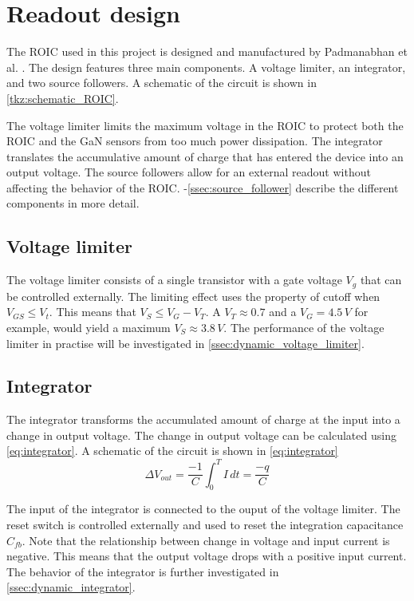 \section{Readout design}\label{sec:readout_design}
The ROIC used in this project is designed and manufactured by Padmanabhan et al. \cite{preethi}. The design features three main components. A voltage limiter, an integrator, and two source followers. A schematic of the circuit is shown in \cref{tkz:schematic_ROIC}.



The voltage limiter limits the maximum voltage in the ROIC to protect both the ROIC and the GaN sensors from too much power dissipation. The integrator translates the accumulative amount of charge that has entered the device into an output voltage. The source followers allow for an external readout without affecting the behavior of the ROIC. -\ref{ssec:source_follower} describe the different components in more detail.



\subsection{Voltage limiter}\label{ssec:voltage_limiter}
The voltage limiter consists of a single transistor with a gate voltage $V_g$ that can be controlled externally. The limiting effect uses the property of cutoff when $V_{GS}\leq V_t$. This means that $V_S\leq V_G - V_T$. A $V_T\approx0.7$ and a $V_G=4.5\,V$ for example, would yield a maximum $V_S\approx 3.8\,V$. The performance of the voltage limiter in practise will be investigated in \cref{ssec:dynamic_voltage_limiter}.

\subsection{Integrator}\label{ssec:integrator}
The integrator transforms the accumulated amount of charge at the input into a change in output voltage. The change in output voltage can be calculated using \cref{eq:integrator}. A schematic of the circuit is shown in \cref{eq:integrator}
\begin{equation}
    \Delta V_{out} = \frac{-1}{C}\int_{0}^{T}I\,dt = \frac{-q}{C} 
    \label{eq:integrator}
\end{equation}



The input of the integrator is connected to the ouput of the voltage limiter. The reset switch is controlled externally and used to reset the integration capacitance $C_{fb}$. Note that the relationship between change in voltage and input current is negative. This means that the output voltage drops with a positive input current. The behavior of the integrator is further investigated in \cref{ssec:dynamic_integrator}.

